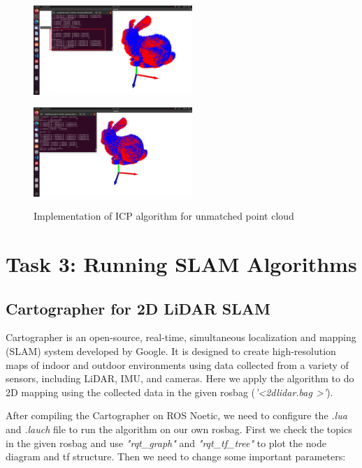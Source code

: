 \documentclass[hyperref]{article}
\theoremstyle{nonumberplain}
\begin{document}
\begin{figure}[H]
	\centering
	\begin{minipage}[t]{0.45\textwidth}
		\centering
		\includegraphics[width=6cm]{2.3.png}
		\label{fig4a}
	\end{minipage}
	\begin{minipage}[t]{0.45\textwidth}
		\centering
		\includegraphics[width=6cm]{2.4_iter50.png}
		\label{fig4b}
	\end{minipage}
	\caption{Implementation of ICP algorithm for unmatched point cloud}
	\label{fig4}
\end{figure} 




\section{Task 3: Running SLAM Algorithms}

\subsection{Cartographer for 2D LiDAR SLAM}

\hspace{1.0em}
Cartographer is an open-source, real-time, simultaneous localization and mapping (SLAM) system developed by Google. It is designed to create high-resolution maps of indoor and outdoor environments using data collected from a variety of sensors, including LiDAR, IMU, and cameras. Here we apply the algorithm to do 2D mapping using the collected data in the given rosbag (\textit{'\textless 2dlidar.bag \textgreater'}). 

After compiling the Cartographer on ROS Noetic, we need to configure the \textit{.lua} and \textit{.lauch} file to run the algorithm on our own rosbag. First we check the topics in the given rosbag and use \textit{"rqt\_graph"} and \textit{"rqt\_tf\_tree"} to plot the node diagram and tf structure. Then we need to change some important parameters:
\end{document}

